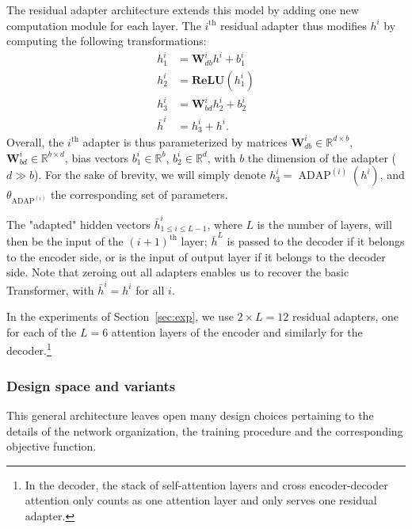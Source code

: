 \documentclass[11pt,a4paper]{article}
\newcommand{\fyDone}[1]{\done[FY]\Todo[FY:]{\textcolor{orange}{#1}}}
\begin{document}
The residual adapter architecture extends this model by adding one new computation module for each layer. The $i^{\text{th}}$ residual adapter thus modifies $h^i$ by computing the following transformations:\fyDone{Use align env}
\begin{align*}
  h^{i}_1 &= \mathbf{W}_{db}^{i}h^{i} + b^i_{1} \\
  h^{i}_2 &= \mathbf{ReLU}(h_1^{i})
  \\
  h^{i}_3 &= \mathbf{W}_{bd}^{i}h_2^{i} + b^i_{2} \\
  \bar{h}^{i} &= h^{i}_3 + h^i.
\end{align*}
Overall, the  $i^{\text{th}}$ adapter is thus parameterized by matrices $\displaystyle{\mathbf{W}_{db}^{i}\in\mathbb{R}^{d\times b}}$,$\displaystyle{\mathbf{W}_{bd}^{i}\in\mathbb{R}^{b\times d}}$, bias vectors $\displaystyle{b^i_{1} \in \mathbb{R}^{b}}$, $\displaystyle{b^i_{2} \in \mathbb{R}^{d}}$, with $b$ the dimension of the adapter ($d \gg b$)\fyDone{Check this}. For the sake of brevity, we will simply denote $h^{i}_3 = \operatorname{ADAP}^{(i)}(h^i)$, and $\theta_{\operatorname{ADAP}^{(i)}}$ the corresponding set of parameters.\fyDone{or is it $h_i$ ?}\fyDone{attention aux matrices $W_i$}

The "adapted" hidden vectors $\bar{h}^i_{ 1\leq i \leq L-1}$, where $L$ is the number of layers, will then be the input of the $(i+1)^{\text{th}}$\fyDone{Self attention ?} layer; $\bar{h}^L$ is passed to the decoder if it belongs to the encoder side, or is the input of output layer if it belongs to the decoder side. Note that zeroing out all adapters enables us to recover the basic Transformer, with $\bar{h}^{i} = h^i$ for all $i$.

In the experiments of Section~\ref{sec:exp}, we use $2\times{}L=12$ residual adapters, one for each of the $L=6$ attention layers of the encoder and similarly for the decoder.\footnote{In the decoder, the stack of self-attention layers and cross encoder-decoder attention only counts as one attention layer and only serves one residual adapter.}

\subsubsection{Design space and variants \label{sssec:design-space}}
This general architecture leaves open many design choices pertaining to the details of the network organization, the training procedure and the corresponding objective function.
\end{document}
